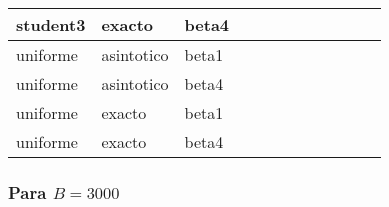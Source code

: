 \documentclass[]{article}
\begin{document}
\begin{table}[H]
\begin{tabular}{l|l|l|l|l|l|l|l|l|l|l|l}
\hline
student3 & exacto & beta4 & \cellcolor{white}{\textcolor{blue}{0.909}} & \cellcolor{white}{\textcolor{blue}{0.898}} & \cellcolor{white}{\textcolor{blue}{0.899}} & \cellcolor{white}{\textcolor{blue}{0.912}} & \cellcolor{white}{\textcolor{blue}{0.899}} & \cellcolor{white}{\textcolor{blue}{0.901}} & \cellcolor{white}{\textcolor{blue}{0.905}} & \cellcolor{white}{\textcolor{blue}{0.91}} & \cellcolor{white}{\textcolor{blue}{0.901}}\\
\hline
\rowcolor{gray!6}  uniforme & asintotico & beta1 & \cellcolor{gray}{\textcolor{red}{0.858}} & \cellcolor{white}{\textcolor{red}{0.881}} & \cellcolor{white}{\textcolor{blue}{0.905}} & \cellcolor{white}{\textcolor{blue}{0.91}} & \cellcolor{white}{\textcolor{blue}{0.893}} & \cellcolor{white}{\textcolor{blue}{0.911}} & \cellcolor{white}{\textcolor{blue}{0.913}} & \cellcolor{white}{\textcolor{blue}{0.898}} & \cellcolor{white}{\textcolor{blue}{0.894}}\\
\hline
uniforme & asintotico & beta4 & \cellcolor{gray}{\textcolor{red}{0.823}} & \cellcolor{white}{\textcolor{blue}{0.892}} & \cellcolor{white}{\textcolor{blue}{0.895}} & \cellcolor{white}{\textcolor{blue}{0.891}} & \cellcolor{white}{\textcolor{blue}{0.897}} & \cellcolor{white}{\textcolor{blue}{0.904}} & \cellcolor{white}{\textcolor{blue}{0.91}} & \cellcolor{white}{\textcolor{blue}{0.897}} & \cellcolor{white}{\textcolor{blue}{0.891}}\\
\hline
\rowcolor{gray!6}  uniforme & exacto & beta1 & \cellcolor{white}{\textcolor{blue}{0.903}} & \cellcolor{white}{\textcolor{blue}{0.898}} & \cellcolor{white}{\textcolor{blue}{0.906}} & \cellcolor{white}{\textcolor{blue}{0.911}} & \cellcolor{white}{\textcolor{blue}{0.893}} & \cellcolor{white}{\textcolor{blue}{0.911}} & \cellcolor{white}{\textcolor{blue}{0.913}} & \cellcolor{white}{\textcolor{blue}{0.898}} & \cellcolor{white}{\textcolor{blue}{0.894}}\\
\hline
uniforme & exacto & beta4 & \cellcolor{white}{\textcolor{blue}{0.9}} & \cellcolor{white}{\textcolor{blue}{0.904}} & \cellcolor{white}{\textcolor{blue}{0.898}} & \cellcolor{white}{\textcolor{blue}{0.893}} & \cellcolor{white}{\textcolor{blue}{0.898}} & \cellcolor{white}{\textcolor{blue}{0.904}} & \cellcolor{white}{\textcolor{blue}{0.911}} & \cellcolor{white}{\textcolor{blue}{0.897}} & \cellcolor{white}{\textcolor{blue}{0.891}}\\
\hline
\end{tabular}
\end{table}

\hypertarget{para-b3000}{%
\subsubsection{\texorpdfstring{Para
\(B=3000\)}{Para B=3000}}\label{para-b3000}}
\end{document}
